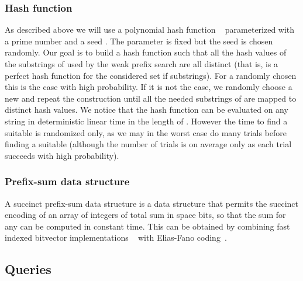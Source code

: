 \documentclass{article}
\newcommand{\?}{\mskip1.5mu}
\begin{document}
\subsubsection{Hash function}
As described above we will use a polynomial hash function ~\cite{KR87} parameterized with a prime number  and a seed . The parameter  is fixed but the seed  is chosen randomly. Our goal is to build a hash function  such that all the hash values of the substrings of  used by the weak prefix search are all distinct (that is,  is a perfect hash function for the considered set if substrings). For a randomly chosen  this is the case with high probability. If it is not the case, we randomly choose a new  and repeat the construction until all the needed substrings of  are mapped to distinct hash values. 
We notice that the hash function  can be evaluated on any string  in deterministic linear time in the length of . However the time to find a suitable  is randomized only, as we may in the worst case do many trials before finding a suitable  (although the number of trials is on average only  as each trial succeeds with high probability). 

\subsubsection{Prefix-sum data structure}
A succinct prefix-sum data structure is a data structure that permits the succinct encoding of an array  of integers of total sum  in space  bits, so that the sum  for any  can be computed in constant time. This can be obtained by combining fast indexed bitvector implementations ~\cite{J89,Mu96,CM96} with Elias-Fano coding~\cite{EliESRCASF,FanNBRISM}. 
\subsection{Queries}
\label{section:const_fix_query}
\end{document}
